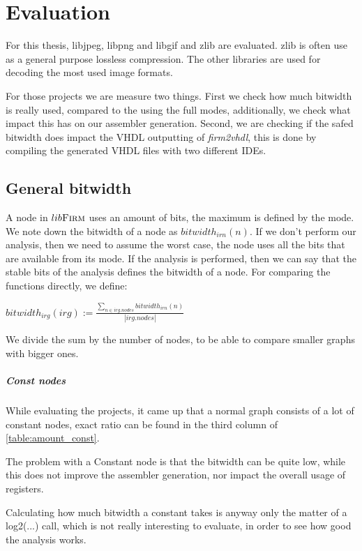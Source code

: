 \chapter{Evaluation}\label{sec:eval}

For this thesis, libjpeg, libpng and libgif and zlib are evaluated. zlib is often use as a general purpose lossless compression. The other libraries are used for decoding the most used image formats.

For those projects we are measure two things. 
First we check how much bitwidth is really used, compared to the using the full modes, additionally, we check what impact this has on our assembler generation.
Second, we are checking if the safed bitwidth does impact the VHDL outputting of \textit{firm2vhdl}, this is done by compiling the generated VHDL files with two different IDEs.

\section{General bitwidth}
A node in $lib\textsc{Firm}$ uses an amount of bits, the maximum is defined by the mode. We note down the bitwidth of a node as $bitwidth_{irn}(n)$.
If we don't perform our analysis, then we need to assume the worst case, the node uses all the bits that are available from its mode.
If the analysis is performed, then we can say that the stable bits of the analysis defines the bitwidth of a node.
For comparing the functions directly, we define:

$bitwidth_{irg}(irg) := \frac{\sum\nolimits_{n \in irg.nodes} bitwidth_{irn}(n)}{|irg.nodes|} $ 

We divide the sum by the number of nodes, to be able to compare smaller graphs with bigger ones. 

\paragraph{Const nodes}

While evaluating the projects, it came up that a normal graph consists of a lot of constant nodes, exact ratio can be found in the third column of  \autoref{table:amount_const}. 

The problem with a Constant node is that the bitwidth can be quite low, while this does not improve the assembler generation, nor impact the overall usage of registers.

Calculating how much bitwidth a constant takes is anyway only the matter of a log2(...) call, which is not really interesting to evaluate, in order to see how good the analysis works.

